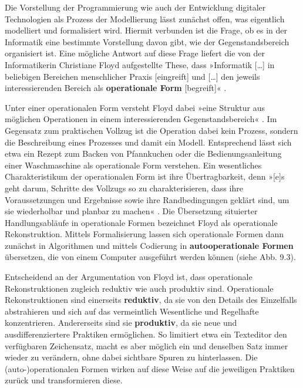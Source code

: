 \documentclass[
  a4paper,
]{book}
\begin{document}
Die Vorstellung der Programmierung wie auch der Entwicklung digitaler Technologien als Prozess der Modellierung lässt zunächst offen, was eigentlich modelliert und formalisiert wird. Hiermit verbunden ist die Frage, ob es in der Informatik eine bestimmte Vorstellung davon gibt, wie der Gegenstandsbereich organisiert ist. Eine mögliche Antwort auf diese Frage liefert die von der Informatikerin Christiane Floyd aufgestellte These, dass »Informatik {[}\ldots{]} in beliebigen Bereichen menschlicher Praxis {[}eingreift{]} und {[}\ldots{]} den jeweils interessierenden Bereich als \textbf{operationale Form} {[}begreift{]}« \citep[S. 238]{floydAutooperationaleFormUnd1997}.

Unter einer operationalen Form versteht Floyd dabei »eine Struktur aus möglichen Operationen in einem interessierenden Gegenstandsbereich« \citep[S. 242]{floydAutooperationaleFormUnd1997}. Im Gegensatz zum praktischen Vollzug ist die Operation dabei kein Prozess, sondern die Beschreibung eines Prozesses und damit ein Modell. Entsprechend lässt sich etwa ein Rezept zum Backen von Pfannkuchen oder die Bedienungsanleitung einer Waschmaschine als operationale Form verstehen. Ein wesentliches Charakteristikum der operationalen Form ist ihre Übertragbarkeit, denn »{[}e{]}s geht darum, Schritte des Vollzugs so zu charakterisieren, dass ihre Voraussetzungen und Ergebnisse sowie ihre Randbedingungen geklärt sind, um sie wiederholbar und planbar zu machen« \citep[S. 242]{floydAutooperationaleFormUnd1997}. Die Übersetzung situierter Handlungsabläufe in operationale Formen bezeichnet Floyd als operationale Rekonstruktion. Mittels Formalisierung lassen sich operationale Formen dann zunächst in Algorithmen und mittels Codierung in \textbf{autooperationale Formen} übersetzen, die von einem Computer ausgeführt werden können (siehe {Abb. 9.3}).

Entscheidend an der Argumentation von Floyd ist, dass operationale Rekonstruktionen zugleich reduktiv wie auch produktiv sind. Operationale Rekonstruktionen sind einerseits \textbf{reduktiv}, da sie von den Details des Einzelfalls abstrahieren und sich auf das vermeintlich Wesentliche und Regelhafte konzentrieren. Andererseits sind sie \textbf{produktiv}, da sie neue und ausdifferenziertere Praktiken ermöglichen. So limitiert etwa ein Texteditor den verfügbaren Zeichensatz, macht es aber möglich ein und denselben Satz immer wieder zu verändern, ohne dabei sichtbare Spuren zu hinterlassen. Die (auto-)operationalen Formen wirken auf diese Weise auf die jeweiligen Praktiken zurück und transformieren diese.
\end{document}
